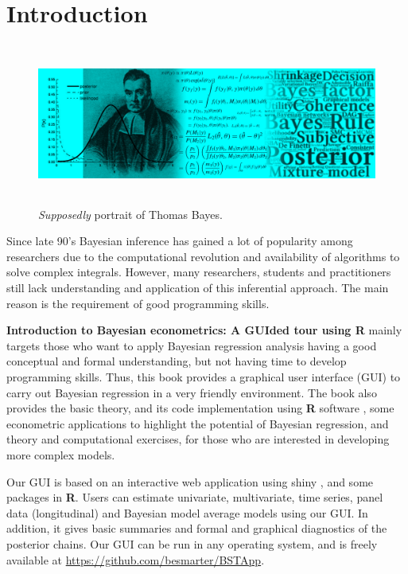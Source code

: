 \chapter*{Introduction}
\begin{figure}[h]
	\includegraphics[width=340pt, height=150pt]{frontmatter/figures/BannerBook.jpg}
	\caption[List of figure caption goes here]{\textit{Supposedly} portrait of Thomas Bayes.}\label{fig01}
\end{figure}

Since late 90’s Bayesian inference has gained a lot of popularity among researchers due to the computational revolution and availability of algorithms to solve complex integrals. However, many researchers, students and practitioners still lack understanding and application of this inferential approach. The main reason is the requirement of good programming skills.

\textbf{Introduction to Bayesian econometrics: A GUIded tour using R} mainly targets those who want to apply Bayesian regression analysis having a good conceptual and formal understanding, but not having time to develop programming skills. Thus, this book provides a graphical user interface (GUI) to carry out Bayesian regression in a very friendly environment. The book also provides the basic theory, and its code implementation using \textbf{R} software \cite{R2021}, some econometric applications to highlight the potential of Bayesian regression, and theory and computational exercises, for those who are interested in developing more complex models.

Our GUI is based on an interactive web application using shiny \cite{Chang2018}, and some packages in \textbf{R}. Users can estimate univariate, multivariate, time series, panel data (longitudinal) and Bayesian model average models using our GUI. In addition, it gives basic summaries and formal and graphical diagnostics of the posterior chains. Our GUI can be run in any operating system, and is freely available at \href{https://github.com/besmarter/BSTApp}{https://github.com/besmarter/BSTApp}. 

